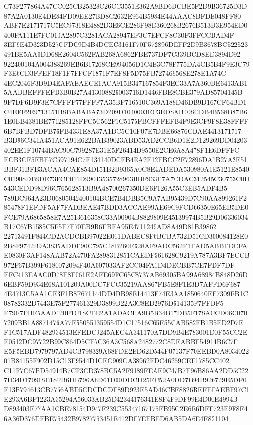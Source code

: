 \documentclass[UTF8,fontset=fandol,zihao=-4,a4paper]{ctexart}
\begin{document}
{{C73F277864A47CC025CB25328C26CC3551E362A9BD6DCBE5F2D9B36725D3D87A2A0130E4DE84FD09EE27BD8C2632E964B5984E44AAAC8BFDE048FF80
ABF7E2171717C5EC97318E4882D3E6CE286F98D360268B2676B513D3E954ED0400FA111E7FC010A2897C3281ACA28947EF3C7EFCF8C30F3FFCCBAD4F
3EF9E4D323D527CFDC9D4B4DCEC3161F70F572896DEFF2D9B3678BC522523491BE5AA0DD68E2604C562FAB268A6862FBE737DF7C339BCD8ED3894D92
922400104A004388269EB6B17268CE994056D1C4E3C78F775DA4CB5B4F9E3C79F3E6CD3FFEF18F1F7FFCF1871F7EF8F5D75FB727469568E278E1A74C
4EC2046F3D9D4EAFAEAECE1ACA915B347167854F3EC33A7A360DE6413AB15AADBEFFFEFB3B0B27A413008826003716D1446FBE8CBE379AD85704145B
9F7DF6D9F3E7CFFFF77FFFF7A35BF716510C369A188D46DB9D167CF64BD1C4EEF2E9713451B8BABABA73D209D1040003EC3ED8AB408CDB4B568B87B6
1E0BB4381BE771285128FFC5C562F1C5175FBCFFFEFB4F9E3CF9F8E38FFFF6B7BFBD7DFB76FB4331E8A37A1DC5C10F07E7DBE66876CDAE4413171717
B3D96C341A451ACA91E622BAB39023ABD53AD2CCB6D1E2D129269DD04203402EE1F10744BAC90C799287E31E5F26414D9550E2CE6A8A478F1E6DFFFC
ECB3CF5EBE7C597194C7F134140DCFB4EA2F12FBCC2F72896DA7B27A2E51BBF31BFB3ACAA4CAE854D151B2D9365A0C8E4ADEDA530980A1E5121E8540
C01908DB9DE73FCF011D99043535728963BBF933F7A7CDAC312545C30753C0D543CEDD98D96C765628513B9A48700267350DE6F126A55C3EB5ADF4B5
789DC964A23D06805042400104BCE7B4DBB5C9A7AB95439D7C90AA899261F285478F1EFDF5AF7FADBEAE47BDD3ACCAE99AE69C9FCD66350E65EB5DE0
FCE79A6865858E7A2513616358C33A00904B8829809E45139974B5B29D06336034B17C67B1585C5F5F7F70EB9B6FBEA95E4711249AD8A49D81B39862
22713491F844CD2ACDCBB97022E001DABEC8F6BCBA732D51CD300084128E02B8F9742B9A3835ADDF90C795C48B260E628AF9ADC562F1EAD5ABBFDCFA
E0830F3AF148AAB72A470FA2898312851CAEDF561628C9219A787A3BF7ECCB972F67B399F6180072094F40A007033AF2CC04FA1D4DECBB7CE7FDF7DF
EFC413EAAC0D78F8F061E2AFE69FC65C8737AB69305BA99A68984B848D26D6EBF59D934E68A101209A00DC7FCC35219AA867FB5E8F1E3D7AFFD6F687
4E4713C5AA1CE3F1B8F671144DD4DB98E14413F74E3AA1850640EF7309FB1C08782332D7443E75F277461329D3899D22A3C8ED2976D614135F7FFDF5
E79F7FBE5AAD120F1C18CEE2A1ADACBA9B5B34B17DB5F178ACCD06C0707209BB1A8871476A77E550551359554D1C17516C65F55CAB582FB1B5ED2D7E
F1C517ADF482934513EFEDC9245AEC4A341170A7DD9B4E783001D0F55CC2EE0512DC97722B99C864D5CE7C36A3C568A2482772C8DEABBF54914B6C7F
E5F5EBD7979797AD4CB798329A68FDE2ED62D544F07137F70EEBD0A803402201B84155F902D15C13F9544D1CEC909CA38962FDC46269CEF1785CC402
C11F7C67BD54914B7CF3CD378BC5A2F9189FEAE9C47B7F96B86AA2DD5C227D34D170918E18FB6DB796A8D61D00DDCD25EC52A0DD7B94B926729E5DF0
F13B794613CB7756ABD5CDCDCDE89D923E5AD46CBF8826BEFEFAEBF97C1E293A6BF1223A35294A56033AB25D42344176341E8F4F9DF99E4D00E4994B
D893403E77AA1CBE78154D947F239C55347167176FB95C2E6E6DFF723E9F8F46A36D376DFBE76432B97827763451E412DF7EFBED6AB5DA6E4F821104
}}
\end{document}
